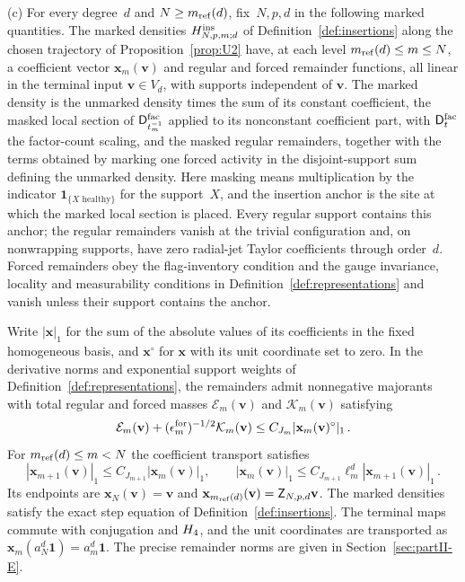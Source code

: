 \begin{proposition}
(c) For every degree~$d$ and $N\ge m_{\mathrm{ref}}(d)$, fix~$N,p,d$ in the following marked quantities. The marked densities $H^{\rm ins}_{N,p,m;d}$ of Definition~\ref{def:insertions} along the chosen trajectory of Proposition~\ref{prop:U2} have, at each level $m_{\mathrm{ref}}(d)\le m\le N$, a coefficient vector $\mathbf x_m(\mathbf v)$ and regular and forced remainder functions, all linear in the terminal input $\mathbf v\in V_d$, with supports independent of $\mathbf v$. The marked density is the unmarked density times the sum of its constant coefficient, the masked local section of $\mathsf{D}^{\mathrm{fac}}_{t_m^{-1}}$ applied to its nonconstant coefficient part, with $\mathsf{D}^{\mathrm{fac}}_t$ the factor-count scaling, and the masked regular remainders, together with the terms obtained by marking one forced activity in the disjoint-support sum defining the unmarked density. Here masking means multiplication by the indicator $\mathbf1_{\{X\text{ healthy}\}}$ for the support~$X$, and the insertion anchor is the site at which the marked local section is placed. Every regular support contains this anchor; the regular remainders vanish at the trivial configuration and, on nonwrapping supports, have zero radial-jet Taylor coefficients through order~$d$. Forced remainders obey the flag-inventory condition and the gauge invariance, locality and measurability conditions in Definition~\ref{def:representations} and vanish unless their support contains the anchor.

Write $|\mathbf x|_1$ for the sum of the absolute values of its coefficients in the fixed homogeneous basis, and $\mathbf x^\circ$ for $\mathbf x$ with its unit coordinate set to zero. In the derivative norms and exponential support weights of Definition~\ref{def:representations}, the remainders admit nonnegative majorants with total regular and forced masses $\mathcal E_m(\mathbf v)$ and $\mathcal K_m(\mathbf v)$ satisfying
\begin{equation}\label{eq:U1-2}
\mathcal E_m(\mathbf v)+(\epsilon_m^{\rm for})^{-1/2}\mathcal K_m(\mathbf v)\le C_{J_m}|\mathbf x_m(\mathbf v)^\circ|_1\,.
\end{equation}
For $m_{\mathrm{ref}}(d)\le m<N$ the coefficient transport satisfies
\begin{equation}\label{eq:U1-3}
|\mathbf x_{m+1}(\mathbf v)|_1\le C_{J_{m+1}}|\mathbf x_m(\mathbf v)|_1,\qquad
|\mathbf x_m(\mathbf v)|_1\le C_{J_{m+1}}\ell_m^d|\mathbf x_{m+1}(\mathbf v)|_1\,.
\end{equation}
Its endpoints are $\mathbf x_N(\mathbf v)=\mathbf v$ and $\mathbf x_{m_{\mathrm{ref}}(d)}(\mathbf v)=\mathsf Z_{N,p,d}\mathbf v$. The marked densities satisfy the exact step equation of Definition~\ref{def:insertions}. The terminal maps commute with conjugation and $H_4$, and the unit coordinates are transported as $\mathbf x_m(a_N^d\mathbf1)=a_m^d\mathbf1$. The precise remainder norms are given in Section~\ref{sec:partII-E}.
\end{proposition}

